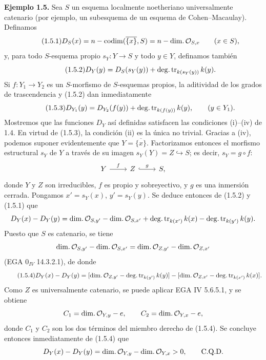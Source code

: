 
\textbf{Ejemplo 1.5.} Sea $S$ un esquema localmente noetheriano
universalmente catenario (por ejemplo, un subesquema de un esquema de
Cohen--Macaulay). Definamos
\begin{equation}\tag{1.5.1}
D_S(x)=n-\operatorname{codim}(\overline{\{x\}},S)=n-\operatorname{dim.}\mathcal O_{S,x}\qquad(x\in S),
\end{equation}
y, para todo $S$-esquema propio $s_Y:Y\to S$ y todo $y\in Y$, definamos
también
\begin{equation}\tag{1.5.2}
D_Y(y)=D_S(s_Y(y))+\operatorname{deg.tr}_{k(s_Y(y))}k(y).
\end{equation}
Si $f:Y_1\to Y_2$ es un $S$-morfismo de $S$-esquemas propios, la aditividad
de los grados de trascendencia y (1.5.2) dan inmediatamente
\begin{equation}\tag{1.5.3}
D_{Y_1}(y)=D_{Y_2}(f(y))+\operatorname{deg.tr}_{k(f(y))}k(y),\qquad(y\in Y_1).
\end{equation}
Mostremos que las funciones $D_Y$ así definidas satisfacen las condiciones
(i)--(iv) de 1.4. En virtud de (1.5.3), la condición (ii) es la única no
trivial. Gracias a (iv), podemos suponer evidentemente que
$Y=\overline{\{x\}}$. Factorizamos entonces el morfismo estructural $s_Y$ de
$Y$ a través de su imagen $s_Y(Y)=Z\hookrightarrow S$; es decir,
$s_Y=g\circ f$:
\[
\begin{tikzcd}
Y \arrow[r,"f"] & Z \arrow[r,hook,"g"] & S,
\end{tikzcd}
\]
donde $Y$ y $Z$ son irreducibles, $f$ es propio y sobreyectivo, y $g$ es una
inmersión cerrada. Pongamos $x'=s_Y(x)$, $y'=s_Y(y)$. Se deduce entonces de
(1.5.2) y (1.5.1) que
\[
D_Y(x)-D_Y(y)=\operatorname{dim.}\mathcal O_{S,y'}-\operatorname{dim.}\mathcal O_{S,x'}+
\operatorname{deg.tr}_{k(x')}k(x)-\operatorname{deg.tr}_{k(y')}k(y).
\]
Puesto que $S$ es catenario, se tiene
\[
\operatorname{dim.}\mathcal O_{S,y'}-\operatorname{dim.}\mathcal O_{S,x'}=
\operatorname{dim.}\mathcal O_{Z,y'}-\operatorname{dim.}\mathcal O_{Z,x'}
\]
(EGA $0_{IV}$ 14.3.2.1), de donde
\begin{equation}\tag{1.5.4}
D_Y(x)-D_Y(y)=
[\operatorname{dim.}\mathcal O_{Z,y'}-\operatorname{deg.tr}_{k(y')}k(y)]-
[\operatorname{dim.}\mathcal O_{Z,x'}-\operatorname{deg.tr}_{k(x')}k(x)].
\end{equation}
Como $Z$ es universalmente catenario, se puede aplicar EGA IV 5.6.5.1, y se
obtiene
\[
C_1=\operatorname{dim.}\mathcal O_{Y,y}-e,\qquad C_2=\operatorname{dim.}\mathcal O_{Y,x}-e,
\]
donde $C_1$ y $C_2$ son los dos términos del miembro derecho de (1.5.4).
Se concluye entonces inmediatamente de (1.5.4) que
\[
D_Y(x)-D_Y(y)=\operatorname{dim.}\mathcal O_{Y,y}-\operatorname{dim.}\mathcal O_{Y,x}>0,
\qquad \text{C.Q.D.}
\]
